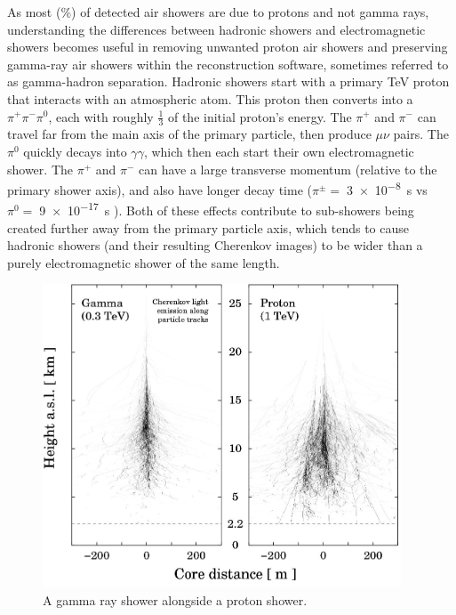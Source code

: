   As most (\%) of detected air showers are due to protons and not gamma rays, understanding the differences between hadronic showers and electromagnetic showers becomes useful in removing unwanted proton air showers and preserving gamma-ray air showers within the reconstruction software, sometimes referred to as gamma-hadron separation.
  Hadronic showers start with a primary \nicetilde TeV proton that interacts with an atmospheric atom.
  This proton then converts into a $\pi^{+}\pi^{-}\pi^{0}$, each with roughly \nicetilde $\frac{1}{3}$ of the initial proton's energy.
  The $\pi^{+}$ and $\pi^{-}$ can travel far from the main axis of the primary particle, then produce $\mu\nu$ pairs.
  The $\pi^{0}$ quickly decays into $\gamma\gamma$, which then each start their own electromagnetic shower.
  The $\pi^{+}$ and $\pi^{-}$ can have a large transverse momentum (relative to the primary shower axis), and also have longer decay time ($\pi^{\pm}=\;$\SI{3e-8}{s} vs $\pi^{0}=\;$\SI{9e-17}{s} \cite{pdg_2014} ).
  Both of these effects contribute to sub-showers being created further away from the primary particle axis, which tends to cause hadronic showers (and their resulting Cherenkov images) to be wider than a purely electromagnetic shower of the same length. 

  \begin{figure}[ht]
    \centering
    \includegraphics[width=0.95\textwidth]{images/showers_gamma_proton}
    \caption[Gamma Ray and Proton Showers]{
      A gamma ray shower alongside a proton shower.\cite{Bernlohr2008149}
    }
    \label{fig:gamma_vs_proton_airshower}
  \end{figure}


